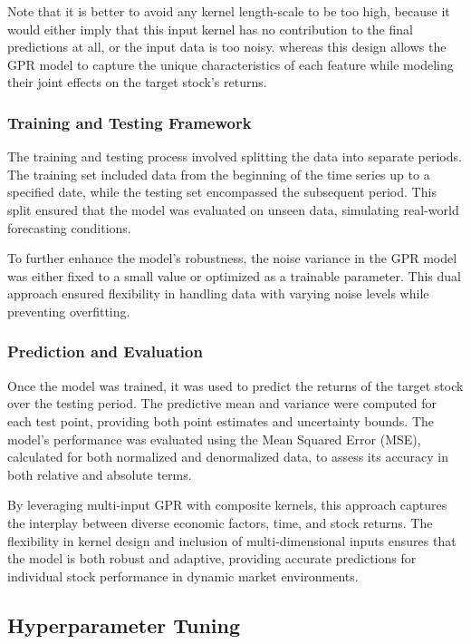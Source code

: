 Note that it is better to avoid any kernel length-scale to be too high, because it would either imply that this input kernel has no contribution to the final predictions at all, or the input data is too noisy.
whereas this design allows the GPR model to capture the unique characteristics of each feature while modeling their joint effects on the target stock's returns.

\subsubsection{Training and Testing Framework}

The training and testing process involved splitting the data into separate periods. The training set included data from the beginning of the time series up to a specified date, while the testing set encompassed the subsequent period. This split ensured that the model was evaluated on unseen data, simulating real-world forecasting conditions.

To further enhance the model's robustness, the noise variance in the GPR model was either fixed to a small value or optimized as a trainable parameter. This dual approach ensured flexibility in handling data with varying noise levels while preventing overfitting.

\subsubsection{Prediction and Evaluation}

Once the model was trained, it was used to predict the returns of the target stock over the testing period. The predictive mean and variance were computed for each test point, providing both point estimates and uncertainty bounds. The model's performance was evaluated using the Mean Squared Error (MSE), calculated for both normalized and denormalized data, to assess its accuracy in both relative and absolute terms.

By leveraging multi-input GPR with composite kernels, this approach captures the interplay between diverse economic factors, time, and stock returns. The flexibility in kernel design and inclusion of multi-dimensional inputs ensures that the model is both robust and adaptive, providing accurate predictions for individual stock performance in dynamic market environments.

\subsection{Hyperparameter Tuning}

